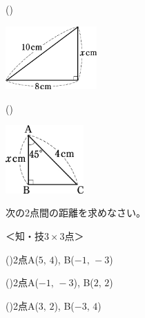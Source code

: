\documentclass[
  12pt,a4paper,lualatex,ja=standard]{bxjsarticle}
\begin{document}
\begin{flushleft}
\begin{multicols}{3}
\columnbreak

()\hspace{2.5pt}

\def\@captype{figure}
\includegraphics[width=35mm]{img/image11.jpg}


\columnbreak

()\hspace{2.5pt}

\def\@captype{figure}
\includegraphics[width=30mm]{img/image12.jpg}


\end{multicols}

\vfill

\setcounter{skaunta}{0}

\noindent{} \hspace{1pt}次の2点間の距離を求めなさい。

%
\begin{flushright}%
\footnotesize{＜知・技$3 \times 3$点＞}%
\end{flushright}%


()\hspace{2.5pt}2点A($5, \, 4$), B($-1, \, -3$)

\vspace{\fill}

()\hspace{2.5pt}2点A($-1, \, -3$), B($2, \, 2$)

\vspace{\fill}

()\hspace{2.5pt}2点A($3, \, 2$), B($-3, \, 4$)

\vspace{\fill}



\end{flushleft}
\end{document}
